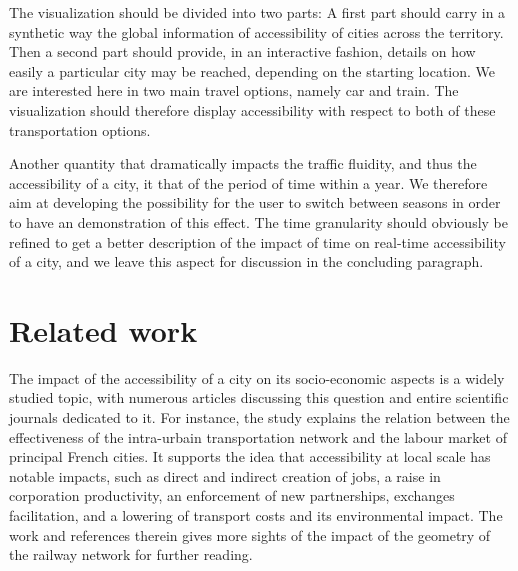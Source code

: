 \documentclass{vgtc}                          %
\begin{document}
The visualization should be divided into two parts: A first part should carry in a synthetic way the global information of accessibility of cities across the territory. Then a second part should provide, in an interactive fashion, details on how easily a particular city may be reached, depending on the starting location. We are interested here in two main travel options, namely car and train. The visualization should therefore display accessibility with respect to both of these transportation options.


 Another quantity that dramatically impacts the traffic fluidity, and thus the accessibility of a city, it that of the period of time within a year. We therefore aim at developing the possibility for the user to switch between seasons in order to have an demonstration of this effect. The time granularity should obviously be refined to get a better description of the impact of time on real-time accessibility of a city, and we leave this aspect for discussion in the concluding paragraph. 


\vspace{0.2cm}
\section{Related work}

\vspace{0.1cm}





The impact of the accessibility of a city on its socio-economic aspects is a widely studied topic, with numerous articles discussing this question and entire scientific journals dedicated to it. For instance, the study \cite{lee1997impact} explains the relation between the effectiveness of the intra-urbain transportation network and the labour market of principal French cities. It supports the idea that accessibility at local scale has notable impacts, such as direct and indirect creation of jobs, a raise in corporation productivity, an enforcement of new partnerships, exchanges facilitation, and a lowering of transport costs and its environmental impact. The work \cite{cao2017investigating} and references therein gives more sights of the impact of the geometry of the railway network for further reading. 
\end{document}

